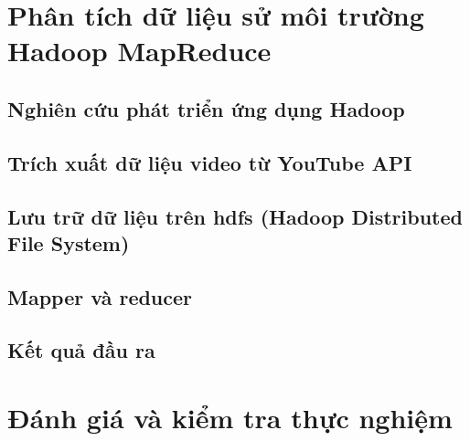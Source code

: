 \documentclass{hcmutarticle}
\begin{document}
	
	
	\section{Phân tích dữ liệu sử  môi trường Hadoop MapReduce}
	\subsection{Nghiên cứu phát triển ứng dụng Hadoop} 
	
	\subsection{Trích xuất dữ liệu video từ YouTube API}
	\subsection{Lưu trữ dữ liệu trên hdfs (Hadoop Distributed File System)}
	\subsection{Mapper và reducer}
	\subsection{Kết quả đầu ra}
	\section{Đánh giá và kiểm tra thực nghiệm}
	
	
	
\end{document}
